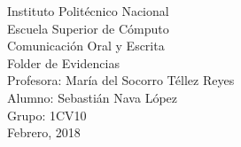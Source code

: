 \documentclass[a4paper,12pt]{article}
\begin{document}
\begin{center}
{\LARGE Instituto Politécnico Nacional}\\[3ex]
{\Large Escuela Superior de Cómputo}\\[14ex]
{\LARGE Comunicación Oral y Escrita}\\[6ex]
{\huge Folder de Evidencias}\\[10ex]
{\Large Profesora: María del Socorro Téllez Reyes}\\[2ex]
{\Large Alumno: Sebastián Nava López}\\[2ex]
{\Large Grupo: 1CV10}\\[12ex]
{\Large Febrero, 2018}


\end{center}
\end{document}
